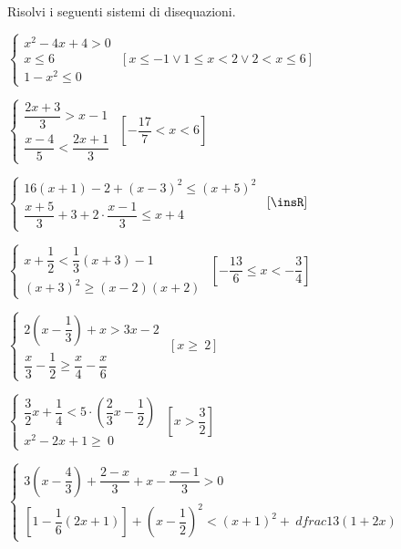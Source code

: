 \begin{esercizio}[\Ast]
 \label{ese:21.41}
 Risolvi i seguenti sistemi di disequazioni.
 \begin{enumeratea}
\item \(\left\{\begin{array}{l}x^2-4x+4>0\\x\le 6\\1-x^2\le 
0\end{array}\right.\)
 \hfill \(\left[x\le -1\vee 1\le x<2\vee 2<x\le 6\right]\)
\item {\longarray \(\left\{\begin{array}{l}
\dfrac{2x+3}{3}>x-1\\
\dfrac{x-4}{5}<\dfrac{2x+1}{3}
\end{array}\right.\)}
 \hfill \(\left[-{\dfrac{17}{7}}<x<6\right]\)
\item {\longarray \(\left\{\begin{array}{l}
16(x+1)-2+(x-3)^{2}\le(x+5)^{2}\\
\dfrac{x+5}{3}+3+2\cdot\dfrac{x-1}{3}\le x+4
\end{array}\right.\)}
 \hfill \(\left[\insR\right]\)
\item \(\left\{\begin{array}{l}
x+\dfrac{1}{2}<\dfrac{1}{3}(x+3)-1\\
(x+3)^{2}\ge (x-2)(x+2)
\end{array}\right.\)
 \hfill \(\left[-{\dfrac{13}{6}}\le x<-{\dfrac{3}{4}}\right]\)
\item {\longarray \(\left\{\begin{array}{l}
2\left(x-\dfrac{1}{3}\right)+x>3x-2\\
\dfrac{x}{3}-\dfrac{1}{2}\ge \dfrac{x}{4}-\dfrac{x}{6}
  \end{array}\right.\)}
 \hfill \(\left[x\ge~2\right]\)
\item \(\left\{\begin{array}{l}
  \dfrac{3}{2}x+\dfrac{1}{4}<5\cdot\left(\dfrac{2}{3}x-\dfrac{1}{2}\right)\\
  x^2-2x+1\ge~0
\end{array}\right.\)
 \hfill \(\left[x>\dfrac{3}{2}\right]\)
\item {\longarray \(\left\{\begin{array}{l}
3\left(x-\dfrac{4}{3}\right)+\dfrac{2-x}{3}+x-\dfrac{x-1}{3}>0\\
\left[1-\dfrac{1}{6}(2x+1)\right]+\left(x-\dfrac{1}{2}\right)^{2}<(x+1)^{2}+\
dfrac{1}{3}(1+2x)
   \end{array}\right.\)}

\end{enumeratea}
\end{esercizio}

